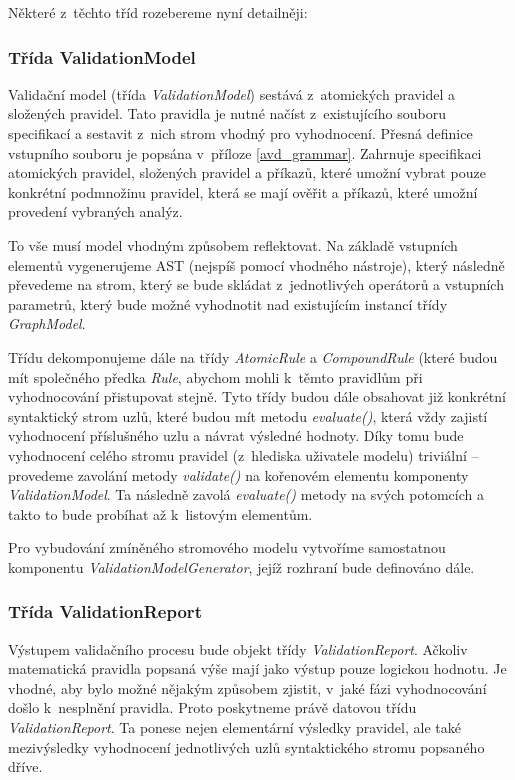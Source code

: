 Některé z~těchto tříd rozebereme nyní detailněji:

\subsubsection{Třída ValidationModel}
Validační model (třída \emph{ValidationModel}) sestává z~atomických pravidel a složených pravidel. Tato pravidla je nutné načíst z~existujícího souboru specifikací a sestavit z~nich strom vhodný pro vyhodnocení. Přesná definice vstupního souboru je popsána v~příloze \ref{avd_grammar}. Zahrnuje specifikaci atomických pravidel, složených pravidel a příkazů, které umožní vybrat pouze konkrétní podmnožinu pravidel, která se mají ověřit a příkazů, které umožní provedení vybraných analýz.

To vše musí model vhodným způsobem reflektovat. Na základě vstupních elementů vygenerujeme AST (nejspíš pomocí vhodného nástroje), který následně převedeme na strom, který se bude skládat z~jednotlivých operátorů a vstupních parametrů, který bude možné vyhodnotit nad existujícím instancí třídy \emph{GraphModel}.

Třídu dekomponujeme dále na třídy \emph{AtomicRule} a \emph{CompoundRule} (které budou mít společného předka \emph{Rule}, abychom mohli k~těmto pravidlům při vyhodnocování přistupovat stejně. Tyto třídy budou dále obsahovat již konkrétní syntaktický strom uzlů, které budou mít metodu \emph{evaluate()}, která vždy zajistí vyhodnocení příslušného uzlu a návrat výsledné hodnoty. Díky tomu bude vyhodnocení celého stromu pravidel (z~hlediska uživatele modelu) triviální -- provedeme zavolání metody \emph{validate()} na kořenovém elementu komponenty \emph{ValidationModel}. Ta následně zavolá \emph{evaluate()} metody na svých potomcích a takto to bude probíhat až k~listovým elementům.

Pro vybudování zmíněného stromového modelu vytvoříme samostatnou komponentu \emph{ValidationModelGenerator}, jejíž rozhraní bude definováno dále.

\subsubsection{Třída ValidationReport}
\label{design-class_validation_report}
Výstupem validačního procesu bude objekt třídy \emph{ValidationReport}. Ačkoliv matematická pravidla popsaná výše mají jako výstup pouze logickou hodnotu. Je vhodné, aby bylo možné nějakým způsobem zjistit, v~jaké fázi vyhodnocování došlo k~nesplnění pravidla. Proto poskytneme právě datovou třídu \emph{ValidationReport}. Ta ponese nejen elementární výsledky pravidel, ale také mezivýsledky vyhodnocení jednotlivých uzlů syntaktického stromu popsaného dříve.

